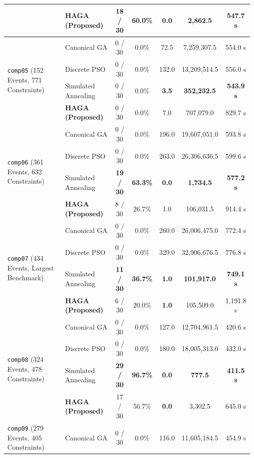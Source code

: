 \documentclass[journal]{IEEEtran}
\begin{document}
\begin{table}[!t]
{\begin{tabular}{ll c c c c c}
& \textbf{HAGA (Proposed)} & 18 / 30 & 60.0\% & \textbf{0.0} & 2,862.5 & 547.7 s \\
\midrule
\multirow{4}{*}{\texttt{comp05} (152 Events, 771 Constraints)} 
& Canonical GA        & 0 / 30 & 0.0\%  & 72.5 & 7,259,307.5 & 554.0 s \\
& Discrete PSO        & 0 / 30 & 0.0\%  & 132.0 & 13,209,514.5 & 556.0 s \\
& Simulated Annealing & 0 / 30 & 0.0\%  & \textbf{3.5} & \textbf{352,232.5} & \textbf{543.9 s} \\
& \textbf{HAGA (Proposed)} & 0 / 30 & 0.0\%  & 7.0 & 707,079.0 & 829.7 s \\
\midrule
\multirow{4}{*}{\texttt{comp06} (361 Events, 632 Constraints)} 
& Canonical GA        & 0 / 30 & 0.0\%  & 196.0 & 19,607,051.0 & 593.8 s \\
& Discrete PSO        & 0 / 30 & 0.0\%  & 263.0 & 26,306,636.5 & 599.6 s \\
& Simulated Annealing & \textbf{19 / 30} & \textbf{63.3\%} & \textbf{0.0} & \textbf{1,734.5} & \textbf{577.2 s} \\
& \textbf{HAGA (Proposed)} & 8 / 30 & 26.7\% & 1.0 & 106,031.5 & 914.4 s \\
\midrule
\multirow{4}{*}{\texttt{comp07} (434 Events, Largest Benchmark)} 
& Canonical GA        & 0 / 30 & 0.0\%  & 260.0 & 26,006,475.0 & 772.4 s \\
& Discrete PSO        & 0 / 30 & 0.0\%  & 329.0 & 32,906,676.5 & 776.8 s \\
& Simulated Annealing & \textbf{11 / 30} & \textbf{36.7\%} & \textbf{1.0} & \textbf{101,917.0} & \textbf{749.1 s} \\
& \textbf{HAGA (Proposed)} & 6 / 30 & 20.0\% & \textbf{1.0} & 105,509.0 & 1,191.8 s \\
\midrule
\multirow{4}{*}{\texttt{comp08} (324 Events, 478 Constraints)} 
& Canonical GA        & 0 / 30 & 0.0\%  & 127.0 & 12,704,961.5 & 420.6 s \\
& Discrete PSO        & 0 / 30 & 0.0\%  & 180.0 & 18,005,313.0 & 432.0 s \\
& Simulated Annealing & \textbf{29 / 30} & \textbf{96.7\%} & \textbf{0.0} & \textbf{777.5} & \textbf{411.5 s} \\
& \textbf{HAGA (Proposed)} & 17 / 30 & 56.7\% & \textbf{0.0} & 3,302.5 & 645.0 s \\
\midrule
\multirow{4}{*}{\texttt{comp09} (279 Events, 405 Constraints)} 
& Canonical GA        & 0 / 30 & 0.0\%  & 116.0 & 11,605,184.5 & 454.9 s \\

\end{tabular}}
\end{table}
\end{document}
